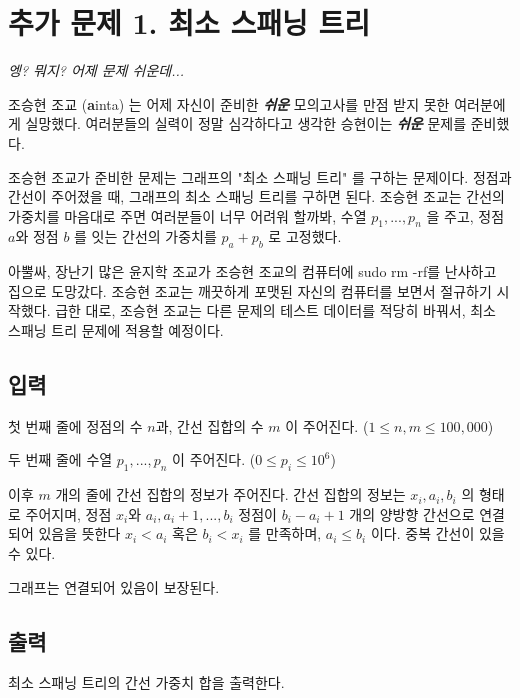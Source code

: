 \documentclass{article}
\begin{document}
	
\section{추가 문제 1. 최소 스패닝 트리}

\begin{center}
	\textit{엥? 뭐지? 어제 문제 쉬운데...}
\end{center}
조승현 조교 (\textbf{a}inta) 는 어제 자신이 준비한 \textbf{\textit{쉬운}} 모의고사를 만점 받지 못한 여러분에게 실망했다. 여러분들의 실력이 정말 심각하다고 생각한 승현이는 \textbf{\textit{쉬운}} 문제를 준비했다. \newline

조승현 조교가 준비한 문제는 그래프의 "최소 스패닝 트리" 를 구하는 문제이다. 정점과 간선이 주어졌을 때, 그래프의 최소 스패닝 트리를 구하면 된다. 조승현 조교는 간선의 가중치를 마음대로 주면 여러분들이 너무 어려워 할까봐, 수열 $p_1, ..., p_n$ 을 주고, 정점  $a$와 정점 $b$ 를 잇는 간선의 가중치를 $p_a + p_b$ 로 고정했다. \newline

아뿔싸, 장난기 많은 윤지학 조교가 조승현 조교의 컴퓨터에 sudo rm -rf를 난사하고 집으로 도망갔다. 조승현 조교는 깨끗하게 포맷된 자신의 컴퓨터를 보면서 절규하기 시작했다. 급한 대로, 조승현 조교는 다른 문제의 테스트 데이터를 적당히 바꿔서, 최소 스패닝 트리 문제에 적용할 예정이다.

\subsection{입력}
첫 번째 줄에 정점의 수 $n$과, 간선 집합의 수 $m$ 이 주어진다. ($1 \leq n, m \leq 100,000$) \newline

두 번째 줄에 수열 $p_1, ..., p_n$ 이 주어진다. ($0 \leq p_i \leq 10^6$) \newline

이후 $m$ 개의 줄에 간선 집합의 정보가 주어진다. 간선 집합의 정보는 $x_i, a_i, b_i$ 의 형태로 주어지며, 정점 $x_i$와 $a_i, a_i + 1, ..., b_i$ 정점이 $b_i - a_i + 1$ 개의 양방향 간선으로 연결되어 있음을 뜻한다 $x_i < a_i$ 혹은 $b_i < x_i$ 를 만족하며, $a_i \leq b_i$ 이다. 중복 간선이 있을 수 있다. \newline

그래프는 연결되어 있음이 보장된다.

\subsection{출력}
최소 스패닝 트리의 간선 가중치 합을 출력한다.
\end{document}
